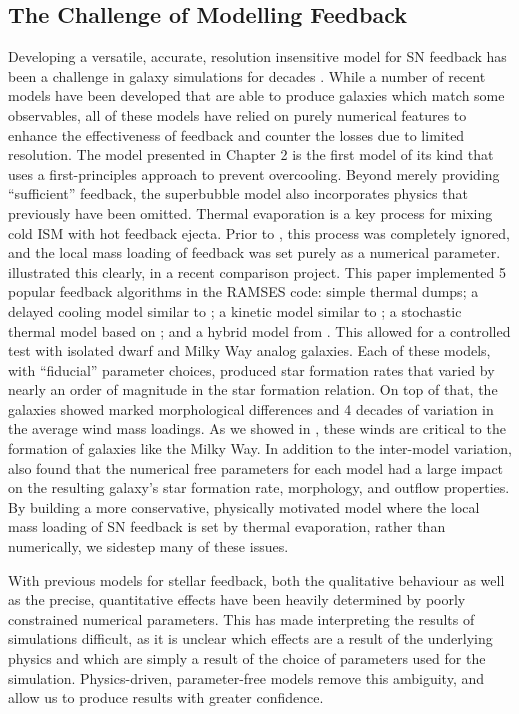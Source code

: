 \subsection{The Challenge of Modelling Feedback}
Developing a versatile, accurate, resolution insensitive model for SN feedback
has been a challenge in galaxy simulations for decades \citep{Katz1992}.  While
a number of recent models have been developed that are able to produce galaxies
which match some observables, all of these models have relied on purely
numerical features to enhance the effectiveness of feedback and counter the
losses due to limited resolution.  The \citet{Keller2014} model presented in
Chapter 2 is the first model of its kind that uses a first-principles approach
to prevent overcooling.  Beyond merely providing ``sufficient'' feedback, the
superbubble model also incorporates physics that previously have been omitted.
Thermal evaporation is a key process for mixing cold ISM with hot feedback
ejecta.  Prior to \citet{Keller2014}, this process was completely ignored, and
the local mass loading of feedback was set purely as a numerical parameter.
\citet{Rosdahl2016} illustrated this clearly, in a recent comparison project.
This paper implemented 5 popular feedback algorithms in the {\sc RAMSES} code:
simple thermal dumps; a delayed cooling model similar to \citet{Agertz2013}; a
kinetic model similar to \citet{DallaVecchia2008}; a stochastic thermal model
based on \citet{DallaVecchia2012}; and a hybrid model from \citet{Kimm2015}.
This allowed for a controlled test with isolated dwarf and Milky Way analog
galaxies. Each of these models, with ``fiducial'' parameter choices, produced
star formation rates that varied by nearly an order of magnitude in the
\citet{Kennicutt1998} star formation relation.  On top of that, the galaxies
showed marked morphological differences and 4 decades of variation in the
average wind mass loadings.  As we showed in \citet{Keller2015}, these winds are
critical to the formation of galaxies like the Milky Way.  In addition to the
inter-model variation, \citet{Rosdahl2016} also found that the numerical free
parameters for each model had a large impact on the resulting galaxy's star
formation rate, morphology, and outflow properties.  By building a more
conservative, physically motivated model where the local mass loading of
SN feedback is set by thermal evaporation, rather than numerically, we
sidestep many of these issues.

With previous models for stellar feedback, both the qualitative behaviour as
well as the precise, quantitative effects have been heavily determined by
poorly constrained numerical parameters.  This has made interpreting the results
of simulations difficult, as it is unclear which effects are a result of
the underlying physics and which are simply a result of the choice of parameters
used for the simulation.  Physics-driven, parameter-free models remove this
ambiguity, and allow us to produce results with greater confidence.  



